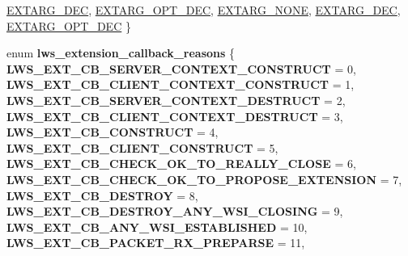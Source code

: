 \begin{DoxyCompactItemize}
\hyperlink{group__extensions_ggacc9f55936dc165257a2e1f7d47bce89ea1c86adf924c8786a12bee9687094673e}{E\+X\+T\+A\+R\+G\+\_\+\+D\+EC}, 
\hyperlink{group__extensions_ggacc9f55936dc165257a2e1f7d47bce89ea5265abe3e1c3f64412f2affe7bffd880}{E\+X\+T\+A\+R\+G\+\_\+\+O\+P\+T\+\_\+\+D\+EC}, 
\newline
\hyperlink{group__extensions_ggacc9f55936dc165257a2e1f7d47bce89eaabcf56c456c1ff6e81dc82586a16f14c}{E\+X\+T\+A\+R\+G\+\_\+\+N\+O\+NE}, 
\hyperlink{group__extensions_ggacc9f55936dc165257a2e1f7d47bce89ea1c86adf924c8786a12bee9687094673e}{E\+X\+T\+A\+R\+G\+\_\+\+D\+EC}, 
\hyperlink{group__extensions_ggacc9f55936dc165257a2e1f7d47bce89ea5265abe3e1c3f64412f2affe7bffd880}{E\+X\+T\+A\+R\+G\+\_\+\+O\+P\+T\+\_\+\+D\+EC}
 \}
\item 
\mbox{\label{group__extensions_gae9993815eee72c6070300a0ae2f022d7}} 
enum {\bfseries lws\+\_\+extension\+\_\+callback\+\_\+reasons} \{ \newline
{\bfseries L\+W\+S\+\_\+\+E\+X\+T\+\_\+\+C\+B\+\_\+\+S\+E\+R\+V\+E\+R\+\_\+\+C\+O\+N\+T\+E\+X\+T\+\_\+\+C\+O\+N\+S\+T\+R\+U\+CT} = 0, 
{\bfseries L\+W\+S\+\_\+\+E\+X\+T\+\_\+\+C\+B\+\_\+\+C\+L\+I\+E\+N\+T\+\_\+\+C\+O\+N\+T\+E\+X\+T\+\_\+\+C\+O\+N\+S\+T\+R\+U\+CT} = 1, 
{\bfseries L\+W\+S\+\_\+\+E\+X\+T\+\_\+\+C\+B\+\_\+\+S\+E\+R\+V\+E\+R\+\_\+\+C\+O\+N\+T\+E\+X\+T\+\_\+\+D\+E\+S\+T\+R\+U\+CT} = 2, 
{\bfseries L\+W\+S\+\_\+\+E\+X\+T\+\_\+\+C\+B\+\_\+\+C\+L\+I\+E\+N\+T\+\_\+\+C\+O\+N\+T\+E\+X\+T\+\_\+\+D\+E\+S\+T\+R\+U\+CT} = 3, 
\newline
{\bfseries L\+W\+S\+\_\+\+E\+X\+T\+\_\+\+C\+B\+\_\+\+C\+O\+N\+S\+T\+R\+U\+CT} = 4, 
{\bfseries L\+W\+S\+\_\+\+E\+X\+T\+\_\+\+C\+B\+\_\+\+C\+L\+I\+E\+N\+T\+\_\+\+C\+O\+N\+S\+T\+R\+U\+CT} = 5, 
{\bfseries L\+W\+S\+\_\+\+E\+X\+T\+\_\+\+C\+B\+\_\+\+C\+H\+E\+C\+K\+\_\+\+O\+K\+\_\+\+T\+O\+\_\+\+R\+E\+A\+L\+L\+Y\+\_\+\+C\+L\+O\+SE} = 6, 
{\bfseries L\+W\+S\+\_\+\+E\+X\+T\+\_\+\+C\+B\+\_\+\+C\+H\+E\+C\+K\+\_\+\+O\+K\+\_\+\+T\+O\+\_\+\+P\+R\+O\+P\+O\+S\+E\+\_\+\+E\+X\+T\+E\+N\+S\+I\+ON} = 7, 
\newline
{\bfseries L\+W\+S\+\_\+\+E\+X\+T\+\_\+\+C\+B\+\_\+\+D\+E\+S\+T\+R\+OY} = 8, 
{\bfseries L\+W\+S\+\_\+\+E\+X\+T\+\_\+\+C\+B\+\_\+\+D\+E\+S\+T\+R\+O\+Y\+\_\+\+A\+N\+Y\+\_\+\+W\+S\+I\+\_\+\+C\+L\+O\+S\+I\+NG} = 9, 
{\bfseries L\+W\+S\+\_\+\+E\+X\+T\+\_\+\+C\+B\+\_\+\+A\+N\+Y\+\_\+\+W\+S\+I\+\_\+\+E\+S\+T\+A\+B\+L\+I\+S\+H\+ED} = 10, 
{\bfseries L\+W\+S\+\_\+\+E\+X\+T\+\_\+\+C\+B\+\_\+\+P\+A\+C\+K\+E\+T\+\_\+\+R\+X\+\_\+\+P\+R\+E\+P\+A\+R\+SE} = 11, 

\end{DoxyCompactItemize}
